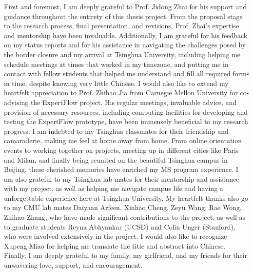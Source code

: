
\begin{acknowledgements}

First and foremost, I am deeply grateful to Prof. Jidong Zhai for his support and guidance throughout the entirety of this thesis project. From the proposal stage to the research process, final presentation, and revisions, Prof. Zhai's expertise and mentorship have been invaluable. Additionally, I am grateful for his feedback on my status reports and for his assistance in navigating the challenges posed by the border closure and my arrival at Tsinghua University, including helping me schedule meetings at times that worked in my timezone, and putting me in contact with fellow students that helped me understand and fill all required forms in time, despite knowing very little Chinese. I would also like to extend my heartfelt appreciation to Prof. Zhihao Jia from Carnegie Mellon University for co-advising the ExpertFlow project. His regular meetings, invaluable advice, and provision of necessary resources, including computing facilities for developing and testing the ExpertFlow prototype, have been immensely beneficial to my research progress. I am indebted to my Tsinghua classmates for their friendship and camaraderie, making me feel at home away from home. From online orientation events to working together on projects, meeting up in different cities like Paris and Milan, and finally being reunited on the beautiful Tsinghua campus in Beijing, these cherished memories have enriched my MS program experience. I am also grateful to my Tsinghua lab mates for their mentorship and assistance with my project, as well as helping me navigate campus life and having a unforgettable experience here at Tsinghua University. My heartfelt thanks also go to my CMU lab mates Daiyaan Arfeen, Xinhao Cheng, Zeyu Wang, Rae Wong, Zhihao Zhang, who have made significant contributions to the project, as well as to graduate students Reyna Abhyankar (UCSD) and Colin Unger (Stanford), who were involved extensively in the project. I would also like to recognize Xupeng Miao for helping me translate the title and abstract into Chinese. Finally, I am deeply grateful to my family, my girlfriend, and my friends for their unwavering love, support, and encouragement.

\end{acknowledgements}
